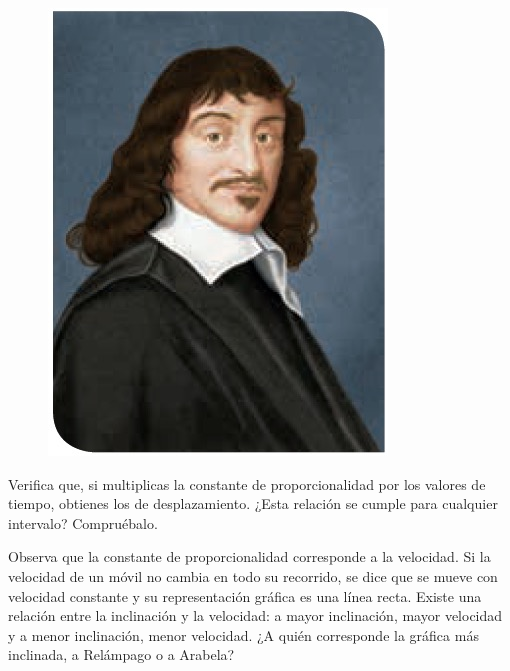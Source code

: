 \documentclass[11pt]{book}
\begin{document}
\begin{minipage}[t]{0.3\linewidth}
  \begin{figure}[H]
    \centering
    \includegraphics[width=\linewidth]{descartes.jpg}
    \label{fig:descartes}
  \end{figure}
\end{minipage}

Verifica que, si multiplicas la constante de proporcionalidad por los valores de tiempo,
obtienes los de desplazamiento. ¿Esta relación se cumple para cualquier intervalo? Compruébalo.

Observa que la constante de proporcionalidad corresponde a la velocidad. Si la velocidad
de un móvil no cambia en todo su recorrido, se dice que se mueve con velocidad constante
y su representación gráfica es una línea recta. Existe una relación entre la inclinación
y la velocidad: a mayor inclinación, mayor velocidad y a menor inclinación, menor velocidad.
¿A quién corresponde la gráfica más inclinada, a Relámpago o a Arabela?
\end{document}

